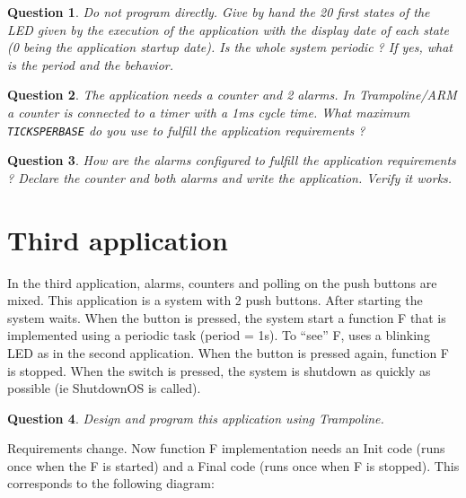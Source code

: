 \documentclass[11pt]{article}
\newtheorem{ex}{Question}
\begin{document}
\begin{ex}
Do not program directly. Give by hand the 20 first states of the LED given by the execution of the application with the display date of each state (0 being the application startup date). Is the whole system periodic ? If yes, what is the period and the behavior.
\end{ex}

\begin{ex}
The application needs a counter and 2 alarms. In Trampoline/ARM a counter is connected to a timer with a 1ms cycle time. What maximum \texttt{TICKSPERBASE} do you use to fulfill the application requirements ?
\end{ex}

\begin{ex}
How are the alarms configured to fulfill the application requirements ? Declare the counter and both alarms and write the application. Verify it works.
\end{ex}

\section{Third application}

In the third application, alarms, counters and polling on the push buttons are mixed. This application is a system with 2 push buttons. After starting the system waits. When the button is pressed, the system start a function F that is implemented using a periodic task (period = 1s). To ``see'' F, uses a blinking LED as in the second application. When the button is pressed again, function F is stopped. When the switch is pressed, the system is shutdown as quickly as possible (ie ShutdownOS is called).

\begin{ex}
Design and program this application using Trampoline.
\end{ex}

Requirements change. Now function F implementation needs an Init code
(runs once when the F is started) and a Final code (runs once when F is stopped).
This corresponds to the following diagram:
\end{document}
